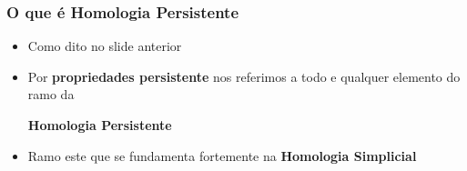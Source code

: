 \documentclass[11pt]{beamer}
\theoremstyle{remark}
\theoremstyle{definition}
\theoremstyle{plain}
\begin{document}
    \begin{frame}
        \frametitle{O que é Homologia Persistente}
        \begin{itemize}
            \item 
                Como dito no slide anterior

            \item 
                Por \textbf{propriedades persistente} nos referimos
                a todo e qualquer elemento do ramo da
                \begin{center}
                    \textbf{Homologia Persistente}
                \end{center}

            \item 
                Ramo este que se fundamenta fortemente na
                \textbf{Homologia Simplicial} \\[1cm]

        \end{itemize}
    \end{frame}
\end{document}
